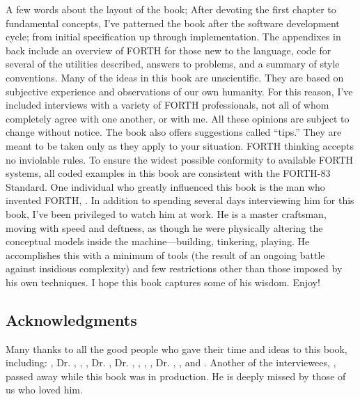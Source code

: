 A few words about the layout of the book; After devoting the first
chapter to fundamental concepts, I've patterned the book after the
software development cycle; from initial specification up through
implementation. The appendixes in back include an overview of FORTH
for those new to the language, code for several of the utilities described,
answers to problems, and a summary of style conventions. Many of the
ideas in this book are unscientific. They are based on subjective
experience and observations of our own humanity. For this reason,
I've included interviews with a variety of FORTH professionals, not
all of whom completely agree with one another, or with me. All these
opinions are subject to change without notice. The book also offers
suggestions called ``tips.'' They are meant to be taken only as they
apply to your situation. FORTH thinking accepts no inviolable rules.
To ensure the widest possible conformity to available FORTH systems,
all coded examples in this book are consistent with the FORTH-83 Standard.
One individual who greatly influenced this book is the man who invented
FORTH, . In addition to spending several days interviewing
him for this book, I've been privileged to watch him at work. He is
a master craftsman, moving with speed and deftness, as though he were
physically altering the conceptual models inside the machine---building,
tinkering, playing. He accomplishes this with a minimum of tools (the
result of an ongoing battle against insidious complexity) and few
restrictions other than those imposed by his own techniques. I hope
this book captures some of his wisdom. Enjoy!


\subsection{Acknowledgments}

Many thanks to all the good people who gave their time and ideas to
this book, including: , Dr. , , ,
Dr. , Dr. , , , ,
Dr. , , and . Another of the interviewees, , passed
away while this book was in production. He is deeply missed by those
of us who loved him.


